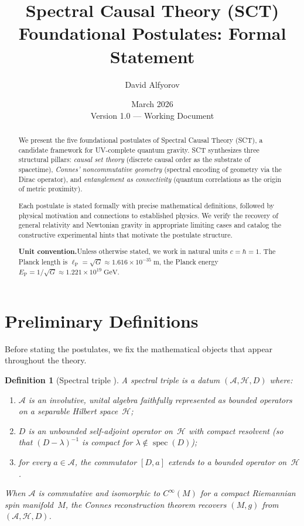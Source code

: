 \documentclass[12pt,a4paper]{article}
\title{\textbf{Spectral Causal Theory (SCT)}\\[6pt]
       \Large Foundational Postulates: Formal Statement}
\author{David Alfyorov}
\date{March 2026 \\[4pt] \small Version 1.0 --- Working Document}
\theoremstyle{postulate}
\newtheorem{definition}{Definition}[section]
\newcommand{\spec}{\operatorname{spec}}
\newcommand{\Hil}{\mathcal{H}}
\newcommand{\Alg}{\mathcal{A}}
\newcommand{\Dirac}{D}
\newcommand{\planck}{\ell_{\mathrm{P}}}
\newcommand{\Eplanck}{E_{\mathrm{P}}}
\begin{document}
\maketitle


\begin{center}
\end{center}

\begin{abstract}
We present the five foundational postulates of Spectral Causal Theory (SCT),
a candidate framework for UV-complete quantum gravity.  SCT synthesizes three
structural pillars: \emph{causal set theory} (discrete causal order as the
substrate of spacetime), \emph{Connes' noncommutative geometry} (spectral
encoding of geometry via the Dirac operator), and \emph{entanglement as
connectivity} (quantum correlations as the origin of metric proximity).

Each postulate is stated formally with precise mathematical definitions,
followed by physical motivation and connections to established physics.
We verify the recovery of general relativity and Newtonian gravity in
appropriate limiting cases and catalog the constructive experimental hints
that motivate the postulate structure.

\medskip\noindent
\textbf{Unit convention.}\quad Unless otherwise stated, we work in natural
units $c = \hbar = 1$.  The Planck length is
$\planck = \sqrt{G} \approx 1.616 \times 10^{-35}\;\mathrm{m}$, the Planck
energy $\Eplanck = 1/\sqrt{G} \approx 1.221 \times 10^{19}\;\mathrm{GeV}$.
\end{abstract}

\tableofcontents
\newpage

\section{Preliminary Definitions}\label{sec:prelim}

Before stating the postulates, we fix the mathematical objects that appear
throughout the theory.

\begin{definition}[Spectral triple {\cite{Connes1994}}]\label{def:spectral-triple}
A \emph{spectral triple} is a datum $(\Alg, \Hil, \Dirac)$ where:
\begin{enumerate}[label=(\roman*)]
  \item $\Alg$ is an involutive, unital algebra faithfully represented as
        bounded operators on a separable Hilbert space~$\Hil$;
  \item $\Dirac$ is an unbounded self-adjoint operator on~$\Hil$ with compact
        resolvent (so that $(\Dirac - \lambda)^{-1}$ is compact for
        $\lambda \notin \spec(\Dirac)$);
  \item for every $a \in \Alg$, the commutator $[\Dirac, a]$ extends to a
        bounded operator on~$\Hil$.
\end{enumerate}
When $\Alg$ is commutative and isomorphic to $C^\infty(M)$ for a compact
Riemannian spin manifold~$M$, the Connes reconstruction theorem recovers
$(M, g)$ from $(\Alg, \Hil, \Dirac)$.
\end{definition}
\end{document}
